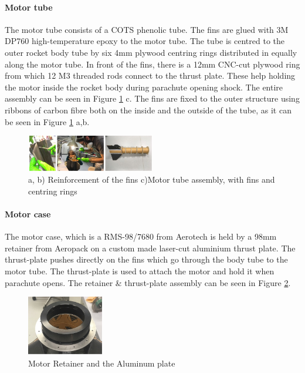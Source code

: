 \paragraph{Motor tube}
\hfill \break
The motor tube consists of a COTS phenolic tube. The fins are glued with 3M DP760 high-temperature epoxy to the motor tube. The tube is centred to the outer rocket body tube by six 4mm plywood centring rings distributed in equally along the motor tube.
In front of the fins, there is a 12mm CNC-cut plywood ring from which 12 M3 threaded rods connect to the thrust plate. These help holding the motor inside the rocket body during parachute opening shock.
The entire assembly can be seen in Figure \ref{f:reinforcement} c. The fins are fixed to the outer structure using ribbons of carbon fibre both on the inside and the outside of the tube, as it can be seen in Figure \ref{f:reinforcement} a,b.

  \begin{figure}[h!]
\centering
\includegraphics[width=0.5\textwidth]{img/fins_glue.jpg}
\caption{a, b) Reinforcement of the fins c)Motor tube assembly, with fins and centring rings}
\label{f:reinforcement}
\end{figure}


\paragraph{Motor case}
\hfill \break
The motor case, which is a RMS-98/7680 from Aerotech is held by a 98mm retainer from Aeropack on a custom made laser-cut aluminium thrust plate. The thrust-plate pushes directly on the fins which go through the body tube to the motor tube. The thrust-plate is used to attach the motor and hold it when parachute opens.
 The retainer \& thrust-plate assembly can be seen in Figure \ref{f:motor_retainer_2}.
\begin{figure}[h!]
        \centering
        \includegraphics[width=0.3\textwidth]{img/motor_retainer.jpg}
        \caption{Motor Retainer and the Aluminum plate}
        \label{f:motor_retainer_2}
    \end{figure}


